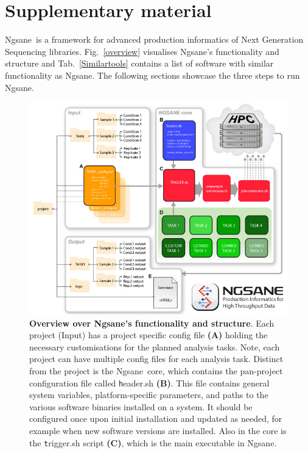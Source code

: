 \documentclass{article}
\newcommand{\prog}{{\sc Ngsane}}
\begin{document}
\pagestyle{empty}

\setcounter{section}{1}

\section*{Supplementary material}

\prog\ is a framework for advanced production informatics of Next Generation Sequencing libraries. Fig.~\ref{overview} visualises \prog 's functionality and structure and Tab.~\ref{Similartools} contains a list of software with similar functionality as \prog. The following sections showcase the three steps to run \prog.


\begin{figure}[ht!]
\centering
\includegraphics[width=120mm]{../../images/overview.jpg}
\caption{
{\bf Overview over \prog 's functionality and structure}. Each project (Input) has a project specific config file {\bf (A)} holding the necessary customisations for the planned analysis tasks. Note, each project can have multiple config files for each analysis task. Distinct from the project is the  \prog\ core, which contains the pan-project configuration file called {\texttt header.sh} {\bf (B)}. This file contains general system variables, platform-specific parameters, and paths to the various software binaries installed on a system. It should be configured once upon initial installation and updated as needed, for example when new software versions are installed. Also in the core is the  {\texttt trigger.sh} script {\bf (C)}, which is the main executable in \prog. 
}
\end{figure}
\end{document}
